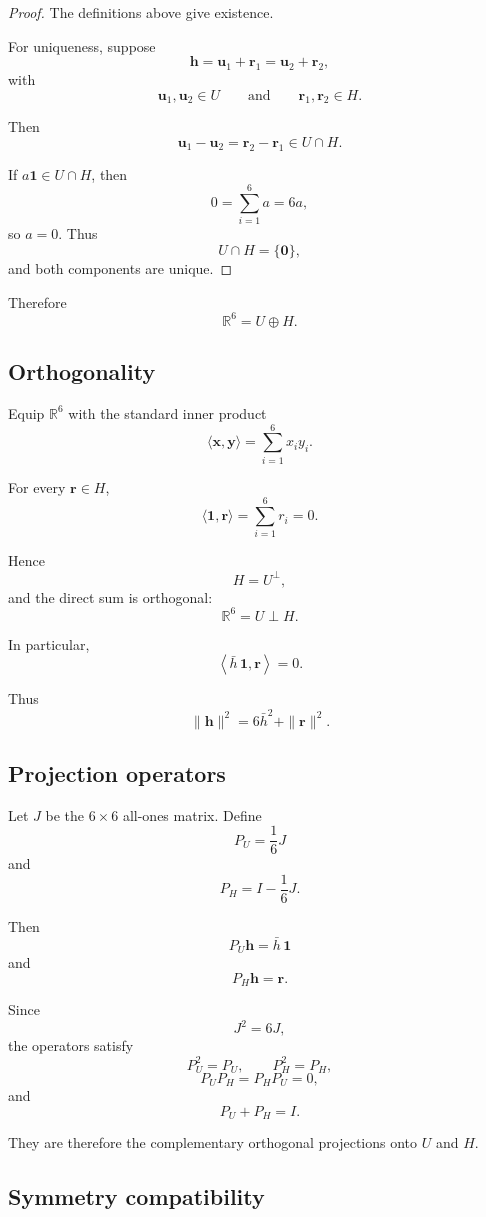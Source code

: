 \begin{proof}
The definitions above give existence.

For uniqueness, suppose
\[
\mathbf h
=
\mathbf u_1+\mathbf r_1
=
\mathbf u_2+\mathbf r_2,
\]
with
\[
\mathbf u_1,\mathbf u_2\in U
\qquad\text{and}\qquad
\mathbf r_1,\mathbf r_2\in H.
\]

Then
\[
\mathbf u_1-\mathbf u_2
=
\mathbf r_2-\mathbf r_1
\in U\cap H.
\]

If \(a\mathbf 1\in U\cap H\), then
\[
0=\sum_{i=1}^{6}a=6a,
\]
so \(a=0\). Thus
\[
U\cap H=\{\mathbf 0\},
\]
and both components are unique.
\end{proof}

Therefore
\[
\mathbb R^6=U\oplus H.
\]

\subsection{Orthogonality}

Equip \(\mathbb R^6\) with the standard inner product
\[
\langle\mathbf x,\mathbf y\rangle
=
\sum_{i=1}^{6}x_i y_i.
\]

For every \(\mathbf r\in H\),
\[
\langle\mathbf 1,\mathbf r\rangle
=
\sum_{i=1}^{6}r_i
=
0.
\]

Hence
\[
H=U^\perp,
\]
and the direct sum is orthogonal:
\[
\mathbb R^6
=
U\mathbin{\perp}H.
\]

In particular,
\[
\left\langle
\bar h\,\mathbf 1,
\mathbf r
\right\rangle
=
0.
\]

Thus
\[
\|\mathbf h\|^2
=
6\bar h^2+\|\mathbf r\|^2.
\]

\subsection{Projection operators}

Let \(J\) be the \(6\times6\) all-ones matrix. Define
\[
P_U=\frac{1}{6}J
\]
and
\[
P_H=I-\frac{1}{6}J.
\]

Then
\[
P_U\mathbf h
=
\bar h\,\mathbf 1
\]
and
\[
P_H\mathbf h
=
\mathbf r.
\]

Since
\[
J^2=6J,
\]
the operators satisfy
\[
P_U^2=P_U,
\qquad
P_H^2=P_H,
\]
\[
P_UP_H=P_HP_U=0,
\]
and
\[
P_U+P_H=I.
\]

They are therefore the complementary orthogonal projections onto \(U\)
and \(H\).

\subsection{Symmetry compatibility}

